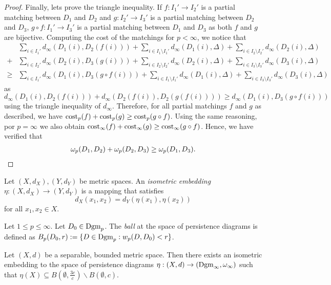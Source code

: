 \begin{proof}
    Finally, lets prove the triangle inequality. If $ f: I_1' \to I_2' $ is a partial matching between $ D_1 $ and $ D_2 $ and $ g: I_2' \to I_3' $ is a partial matching between $ D_2 $ and $ D_3 $, $ g \circ f: I_1' \to I_3' $ is a partial matching between $ D_1 $ and $ D_3 $ as both $ f $ and $ g $ are bijective. Computing the cost of the matchings for $ p < \infty$, we notice that
    \begin{align*}
        &\sum_{i\in I_1'} d_\infty(D_1(i), D_2(f(i))) + \sum_{i\in I_1 \setminus I_1'} d_\infty(D_1(i), \Delta) + \sum_{i\in I_2 \setminus I_2'} d_\infty(D_2(i), \Delta) \\
        + &\sum_{i\in I_2'} d_\infty(D_2(i), D_3(g(i))) + \sum_{i\in I_2 \setminus I_2'} d_\infty(D_2(i), \Delta) + \sum_{i\in I_3 \setminus I_3'} d_\infty(D_3(i), \Delta) \\
        \geq &\sum_{i\in I_1'} d_\infty(D_1(i), D_3(g \circ f(i))) + \sum_{i\in I_1 \setminus I_1'} d_\infty(D_1(i), \Delta) + \sum_{i\in I_3 \setminus I_3'} d_\infty(D_3(i), \Delta)
    \end{align*}
    as $ d_\infty(D_1(i), D_2(f(i))) + d_\infty(D_2(f(i)), D_2(g(f(i)))) \geq d_\infty(D_1(i), D_3(g \circ f(i))) $ using the triangle inequality of $ d_\infty $. Therefore, for all partial matchings $ f $ and $ g $ as described, we have $ \operatorname{cost}_p (f) + \operatorname{cost}_p (g) \geq \operatorname{cost}_p (g \circ f) $. Using the same reasoning, por $ p = \infty $ we also obtain $ \operatorname{cost}_\infty (f) + \operatorname{cost}_\infty (g) \geq \operatorname{cost}_\infty (g \circ f) $. Hence, we have verified that
    \begin{align*}
        \omega_p(D_1, D_2) + \omega_p(D_2, D_3) \geq \omega_p(D_1, D_3).
    \end{align*}
\end{proof}

\begin{definition}
    Let $ (X, d_X), (Y, d_Y) $ be metric spaces. An {\it isometric embedding} $ \eta: (X, d_X) \to (Y, d_Y) $ is a mapping that satisfies
    $$
        d_X(x_1, x_2) = d_Y(\eta(x_1), \eta(x_2))
    $$
    for all $x_1, x_2 \in X$.
\end{definition}

\begin{definition}
    Let $ 1\leq p \leq \infty $. Let $ D_0 \in \operatorname{Dgm}_p $. The {\it ball} at the space of persistence diagrams is defined as $ B_p(D_0, r) := \{D \in \operatorname{Dgm}_p : w_p(D, D_0) < r \} $.
\end{definition}

\begin{theorem}
    Let $ (X, d) $ be a separable, bounded metric space. Then there exists an isometric embedding to the space of persistence diagrams $ \eta: (X, d) \to (\operatorname{Dgm}_\infty, \omega_\infty)$ such that $ \eta(X) \subseteq B(\emptyset, \frac{3c}{c}) \backslash B(\emptyset, c) $.
\end{theorem}

